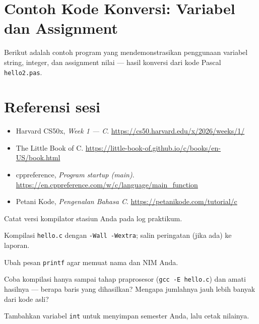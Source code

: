 \documentclass[../main.tex]{subfiles}
\begin{document}
\section{Contoh Kode Konversi: Variabel dan Assignment}

Berikut adalah contoh program yang mendemonstrasikan penggunaan variabel string, integer, dan assignment nilai --- hasil konversi dari kode Pascal \texttt{hello2.pas}.



\section{Referensi sesi}

\begin{itemize}[leftmargin=*]
  \item Harvard CS50x, \textit{Week 1 --- C}. \url{https://cs50.harvard.edu/x/2026/weeks/1/}
  \item The Little Book of C. \url{https://little-book-of.github.io/c/books/en-US/book.html}
  \item cppreference, \textit{Program startup (main)}. \url{https://en.cppreference.com/w/c/language/main_function}
  \item Petani Kode, \textit{Pengenalan Bahasa C}. \url{https://petanikode.com/tutorial/c}
\end{itemize}

\begin{aktivitas}
  \item Catat versi kompilator stasiun Anda pada log praktikum.
  \item Kompilasi \texttt{hello.c} dengan \texttt{-Wall -Wextra}; salin peringatan (jika ada) ke laporan.
  \item Ubah pesan \texttt{printf} agar memuat nama dan NIM Anda.
  \item Coba kompilasi hanya sampai tahap praprosesor (\texttt{gcc -E hello.c}) dan amati hasilnya --- berapa baris yang dihasilkan? Mengapa jumlahnya jauh lebih banyak dari kode asli?
  \item Tambahkan variabel \texttt{int} untuk menyimpan semester Anda, lalu cetak nilainya.
\end{aktivitas}
\end{document}
